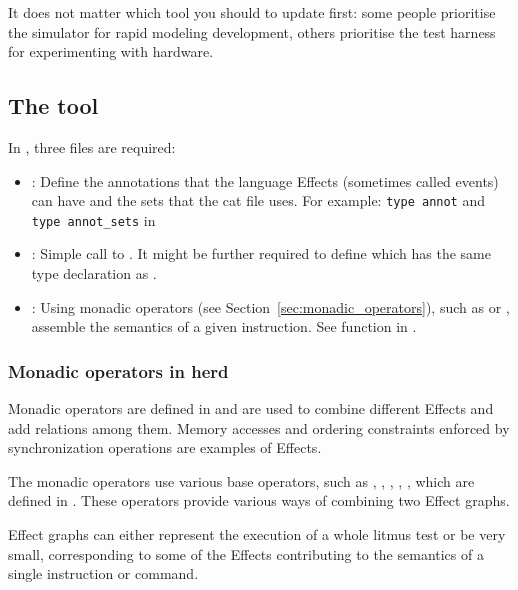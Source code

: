 It does not matter which tool you should to update first: some people
prioritise the simulator \herd{} for rapid modeling development, others
prioritise the test harness \litmus{} for experimenting with hardware.  

\subsection{The \herd{} tool}

In , three files are required:
\begin{itemize}
\item {}: Define the annotations that the language Effects
(sometimes called events) can have and the sets that the cat file uses. For
example: \texttt{type annot} and \texttt{type annot\_sets} in

\item {}: Simple call to . It might be
further required to define  which has the same type
declaration as .

\item {}: Using monadic operators (see
Section~\ref{sec:monadic_operators}), such as \source{>>=} or \source{>>|},
assemble the semantics of a given instruction. See function
 in .
\end{itemize}

\subsubsection{Monadic operators in herd \label{sec:monadic_operators}}

Monadic operators are defined in  and are used to
combine different Effects and add relations among them. Memory accesses and
ordering constraints enforced by synchronization operations are examples of
Effects.

The monadic operators use various base operators, such as \source{=**=},
\source{=*$=}, \source{=$$=}, \source{+|+}, \source{=|=}, which are defined in
. These operators provide various ways of combining two
Effect graphs.

Effect graphs can either represent the execution of a whole litmus test or be
very small, corresponding to some of the Effects contributing to the semantics
of a single instruction or command.

